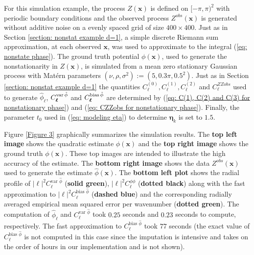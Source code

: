 \documentclass[10pt,noinfoline]{imsart}
\newcommand{\bs}{\boldsymbol}
\begin{document}
For this simulation example, the process $Z(\bs x)$  is defined on $[-\pi,\pi)^2$ with periodic boundary conditions and the observed process $Z^{obs}(\bs x)$ is generated without additive noise on a evenly spaced grid of size $400 \times 400$. Just as in Section \ref{section: nonstat example d=1}, a simple discrete Riemann sum approximation, at each observed $\bs x$, was used to approximate to the integral (\ref{eq: nonstate phase}). 
The ground truth potential $\phi(\bs x)$, used to generate the nonstationarity in $Z(\bs x)$, is simulated from a mean zero stationary Gaussian process with Mat\'ern parameters $(\nu, \rho, \sigma^2):=(5, 0.3 \pi, 0.5^2)$. Just as in Section \ref{section: nonstat example d=1} the quantities $C^{(0)}_{\bs \ell}, C^{(1)}_{\bs \ell}, C^{(2)}_{\bs \ell}$ and $C^{ZZobs}_{\bs \ell}$ used to generate  $\hat\phi_{\bs\ell}$, $C^{\text{var\,}\hat\phi}_{\bs\ell}$ and $C^{\text{bias\,}\hat\phi}_{\bs \ell}$ are determined by (\ref{eq: C(1), C(2) and C(3) for nonstationary phase}) and (\ref{eq: CZZobs for nonstationary phase}). Finally, the parameter $t_0$ used in (\ref{eq: modeling eta}) to determine $\bs \eta_k$ is set to $1.5$.





Figure \ref{Figure 3} graphically summarizes the simulation results. The \textbf{top left image} shows the quadratic estimate $\hat\phi(\bs x)$ and the \textbf{top right image} shows the ground truth $\phi(\bs x)$. These top images are intended to illustrate the high accuracy of the estimate. The \textbf{bottom right image} shows the data $Z^{obs}(\bs x)$ used to generate the estimate $\hat\phi(\bs x)$. The \textbf{bottom left plot} shows the radial profile of $|\bs \ell|^2C_{\bs \ell}^{\text{var }\hat\phi}$ (\textbf{solid green}), $|\bs \ell|^2C_{\bs \ell}^{\phi\phi}$ (\textbf{dotted black}) along with the fast approximation to $|\bs \ell|^2C_{\bs \ell}^{\text{bias }\hat\phi}$ (\textbf{dashed blue}) and the corresponding radially averaged empirical mean squared error per wavenumber (\textbf{dotted green}). The computation of $\hat\phi_{\bs \ell}$ and  $C_{\bs \ell}^{\text{var }\hat\phi}$ took $0.25$ seconds and $0.23$ seconds to compute, respectively. The fast approximation to $C_{\bs \ell}^{\text{bias }\hat\phi}$ took $77$ seconds (the exact value of $C_{\bs \ell}^{\text{bias }\hat\phi}$ is not computed in this case since the imputation is intensive and takes on the order of hours in our implementation and is not shown).
\end{document}
